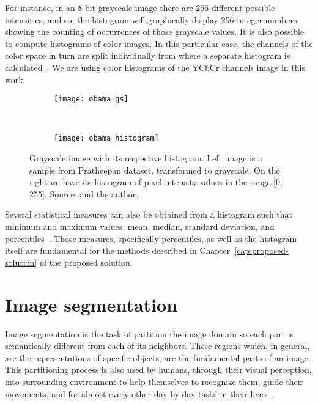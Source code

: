 For instance, in an 8-bit grayscale image there are 256 different possible intensities, and so, the histogram will graphically display 256 integer numbers showing the counting of occurrences of those grayscale values. It is also possible to compute histograms of color images. In this particular case, the channels of the color space in turn are split individually from where a separate histogram is calculated~\citep{fisher:03}. We are using color histograms of the YCbCr channels image in this work.

\begin{figure}[H]
    \centering
    \begin{subfigure}[t]{0.4\textwidth}
        \texttt{[image: obama\_gs]}
    \end{subfigure}
    ~
    \begin{subfigure}[t]{0.54\textwidth}
        \texttt{[image: obama\_histogram]}
    \end{subfigure}
    \caption[Grayscale image with its respective histogram]{Grayscale image with its respective histogram. Left image is a sample from Pratheepan dataset, transformed to grayscale. On the right we have its histogram of pixel intensity values in the range [0, 255]. Source: \citet{tan:12} and the author.}
    \label{fig:obama_hist}
\end{figure}

Several statistical measures can also be obtained from a histogram such that minimum and maximum values, mean, median, standard deviation, and percentiles~\citep{pedrini:08}. Those measures, specifically percentiles, as well as the histogram itself are fundamental for the methods described in Chapter~\ref{cap:proposed-solution} of the proposed solution.


\section{Image segmentation}
\label{sec:image_segmentation}
Image segmentation is the task of partition the image domain so each part is semantically different from each of its neighbors. These regions which, in general, are the representations of specific objects, are the fundamental parts of an image. This partitioning process is also used by humans, through their visual perception, into surrounding environment to help themselves to recognize them, guide their movements, and for almost every other day by day tasks in their lives~\citep{konstantinos:00}.

